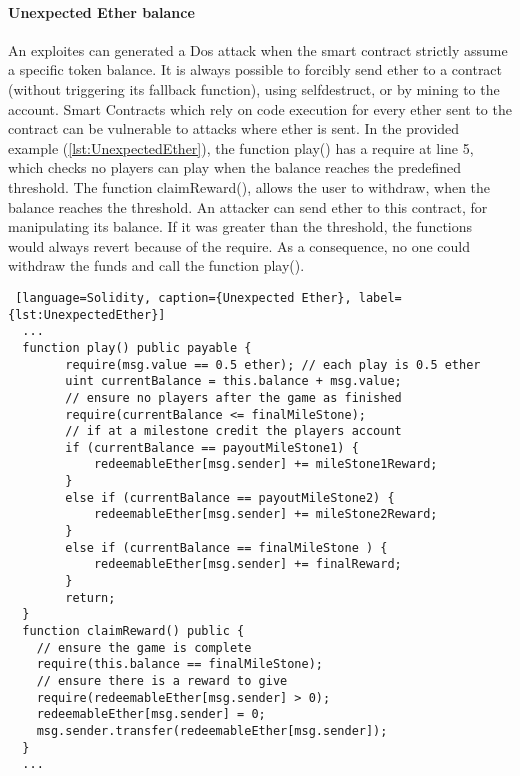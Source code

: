 \documentclass[a4paper,sigconf, language=french,
language=german, language=spanish, language=english]{acmart}
\begin{document}
\paragraph{Unexpected Ether balance} An exploites can generated a Dos attack when the smart contract strictly assume a specific token balance. 
It is always possible to forcibly send ether to a contract (without triggering its fallback function), 
using selfdestruct, or by mining to the account. Smart Contracts which rely on code execution for every ether sent to the contract can be vulnerable to attacks where ether is sent.
In the provided example (\autoref{lst:UnexpectedEther}), the function play() has a require at line 5, which checks no players can play when the balance 
reaches the predefined threshold. The function claimReward(), allows the user to withdraw, when the balance reaches the threshold. 
An attacker can send ether to this contract, for manipulating its balance. If it was greater than the threshold, the functions would always 
revert because of the require. As a consequence, no one could withdraw the funds and call the function play().
\begin{lstlisting} [language=Solidity, caption={Unexpected Ether}, label={lst:UnexpectedEther}]
  ...
  function play() public payable {
        require(msg.value == 0.5 ether); // each play is 0.5 ether
        uint currentBalance = this.balance + msg.value;
        // ensure no players after the game as finished
        require(currentBalance <= finalMileStone);
        // if at a milestone credit the players account
        if (currentBalance == payoutMileStone1) {
            redeemableEther[msg.sender] += mileStone1Reward;
        }
        else if (currentBalance == payoutMileStone2) {
            redeemableEther[msg.sender] += mileStone2Reward;
        }
        else if (currentBalance == finalMileStone ) {
            redeemableEther[msg.sender] += finalReward;
        }
        return;
  }
  function claimReward() public {
    // ensure the game is complete
    require(this.balance == finalMileStone);
    // ensure there is a reward to give
    require(redeemableEther[msg.sender] > 0); 
    redeemableEther[msg.sender] = 0;
    msg.sender.transfer(redeemableEther[msg.sender]);
  }
  ...
\end{lstlisting}
\end{document}
